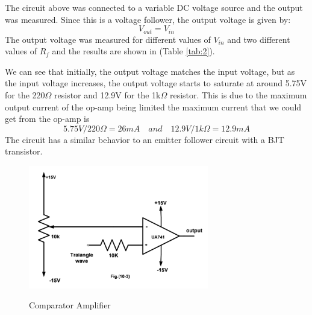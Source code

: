 \documentclass[12pt]{article}
\begin{document}
The circuit above was connected to a variable DC voltage source and the output was measured. Since this is a voltage follower, the output voltage is given by:
\begin{equation}
    V_{out} = V_{in}
    \label{eq:2}
\end{equation}
The output voltage was measured for different values of $V_{in}$ and two different values of $R_f$ and the results are shown in (Table \ref{tab:2}).
\begin{table}[H]
    \caption{Voltage Follower Amplifier Voltages}
    \label{tab:2}
\end{table}
We can see that initially, the output voltage matches the input voltage, but as the input voltage increases, the output voltage starts to saturate at around 5.75V for the 220$\Omega$ resistor and 12.9V for the 1k$\Omega$ resistor. This is due to the maximum output current of the op-amp being limited the maximum current that we could get from the op-amp is
\begin{equation}
    5.75V/220\Omega = 26mA\quad and \quad 12.9V/1k\Omega = 12.9mA
\end{equation} The circuit has a similar behavior to an emitter follower circuit with a BJT transistor.
\begin{figure}[H]
    \centering
    \includegraphics[width=0.7\textwidth]{assets/main/2023-08-27-19-19-20.png}
    \caption{Comparator Amplifier}
    \label{fig:3}
    \cite{manual}
\end{figure}
\end{document}
